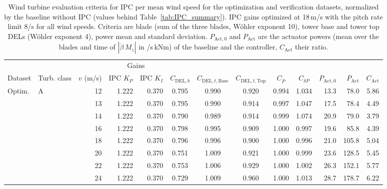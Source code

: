 \begin{table}[htbp]
    \centering
    \footnotesize
    \caption[Wind turbine evaluation criteria for IPC per wind speed]{\label{tab:IPC_windspeeds} Wind turbine evaluation criteria for IPC per mean wind speed for the optimization and verification datasets, normalized by the baseline without IPC (values behind Table~\ref{tab:IPC_summary}). IPC gains optimized at 18\,m/s with the pitch rate limit 8\textdegree/s for all wind speeds. Criteria are blade (sum of the three blades, W\"ohler exponent 10), tower base and tower top DELs (W\"ohler exponent 4), power mean and standard deviation. $P_{\text{Act},0}$ and $P_{\text{Act}}$ are the actuator powers (mean over the blades and time of $|\dot\beta\, M_z|$ in \textdegree/s\,kNm) of the baseline and the controller, $C_{\text{Act}}$ their ratio.}
    \begin{adjustbox}{max width=\textwidth}
    \begin{tabular}{@{}llr*{2}{r}*{5}{c}rrc@{}}
        \toprule
        & & & \multicolumn{2}{c}{Gains} & & & & & & & & \\
        \cmidrule(lr){4-5}
        Dataset & Turb. class & $v$ (m/s) & IPC $K_P$ & IPC $K_I$ & $C_{\text{DEL},b}$ & $C_{\text{DEL},t,\text{Base}}$ & $C_{\text{DEL},t,\text{Top}}$ & $C_{\bar{P}}$ & $C_{\delta P}$ & $P_{\text{Act},0}$ & $P_{\text{Act}}$ & $C_{\text{Act}}$ \\
        \midrule
        Optim. & A & 12 & 1.222 & 0.370 & 0.795 & 0.990 & 0.920 & 0.994 & 1.034 & 13.3 & 78.0 & 5.86 \\
         &  & 13 & 1.222 & 0.370 & 0.795 & 0.990 & 0.914 & 0.997 & 1.047 & 17.5 & 78.4 & 4.49 \\
         &  & 14 & 1.222 & 0.370 & 0.790 & 0.989 & 0.914 & 0.999 & 1.074 & 20.9 & 79.0 & 3.79 \\
         &  & 16 & 1.222 & 0.370 & 0.798 & 0.995 & 0.909 & 1.000 & 0.997 & 19.6 & 85.8 & 4.39 \\
         &  & 18 & 1.222 & 0.370 & 0.796 & 0.996 & 0.900 & 1.000 & 0.996 & 21.0 & 105.8 & 5.04 \\
         &  & 20 & 1.222 & 0.370 & 0.751 & 1.009 & 0.921 & 1.000 & 0.999 & 23.6 & 128.5 & 5.45 \\
         &  & 22 & 1.222 & 0.370 & 0.753 & 1.006 & 0.929 & 1.000 & 1.002 & 26.3 & 152.1 & 5.77 \\
         &  & 24 & 1.222 & 0.370 & 0.729 & 1.009 & 0.960 & 1.000 & 1.013 & 28.7 & 178.7 & 6.22 \\

\end{tabular}
\end{adjustbox}
\end{table}
